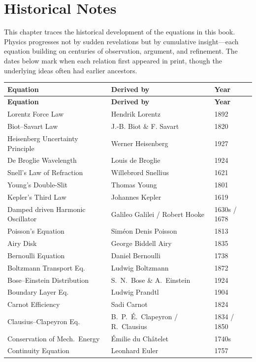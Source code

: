 \chapter{Historical Notes}

This chapter traces the historical development of the equations in this book. Physics progresses not by sudden revelations but by cumulative insight---each equation building on centuries of observation, argument, and refinement. The dates below mark when each relation first appeared in print, though the underlying ideas often had earlier ancestors.

\begin{longtable}{p{5.5cm}p{4.5cm}p{2cm}}
\textbf{Equation} & \textbf{Derived by} & \textbf{Year} \\
\hline
\endfirsthead
\textbf{Equation} & \textbf{Derived by} & \textbf{Year} \\
\hline
\endhead
Lorentz Force Law & Hendrik Lorentz & 1892 \\
Biot--Savart Law & J.-B. Biot \& F. Savart & 1820 \\
Heisenberg Uncertainty Principle & Werner Heisenberg & 1927 \\
De Broglie Wavelength & Louis de Broglie & 1924 \\
Snell's Law of Refraction & Willebrord Snellius & 1621 \\
Young's Double-Slit & Thomas Young & 1801 \\
Kepler's Third Law & Johannes Kepler & 1619 \\
Damped driven Harmonic Oscillator & Galileo Galilei / Robert Hooke & 1630s / 1678 \\
Poisson's Equation & Sim\'eon Denis Poisson & 1813 \\
Airy Disk & George Biddell Airy & 1835 \\
Bernoulli Equation & Daniel Bernoulli & 1738 \\
Boltzmann Transport Eq. & Ludwig Boltzmann & 1872 \\
Bose--Einstein Distribution & S.\ N.\ Bose \& A.\ Einstein & 1924 \\
Boundary Layer Eq. & Ludwig Prandtl & 1904 \\
Carnot Efficiency & Sadi Carnot & 1824 \\
Clausius--Clapeyron Eq. & B.\ P.\ \'E.\ Clapeyron / R.\ Clausius & 1834 / 1850 \\
Conservation of Mech.\ Energy & \'Emilie du Ch\^atelet & 1740s \\
Continuity Equation & Leonhard Euler & 1757 \\

\end{longtable}
